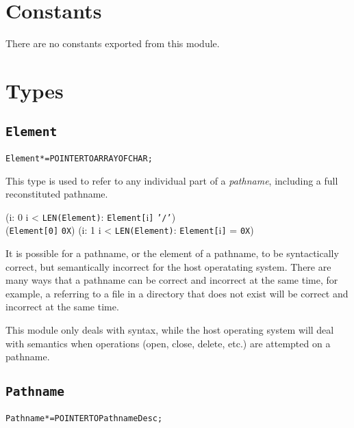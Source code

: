 \section{Constants}

There are no constants exported from this module.


\section{Types}

\subsection{\texttt{Element}}\label{pathnames:element}
\begin{alltt}
  Element* = POINTER TO ARRAY OF CHAR;
\end{alltt}

This type is used to refer to any individual part of a
\emph{pathname}, including a full reconstituted pathname.

\begin{invariant}
  (\forall i: 0 \leq i < \texttt{LEN(Element\deref)}:
  \texttt{Element[}i\texttt{]} \neq \texttt{'/'}) \logicaland
  \\
  (\texttt{Element[0]} \neq \texttt{0X}) \logicaland
  (\exists i: 1 \leq i < \texttt{LEN(Element\deref)}:
  \texttt{Element[}i\texttt{]} = \texttt{0X})
\end{invariant}

\begin{xnote}
It is possible for a pathname, or the element of a pathname, to be
syntactically correct, but semantically incorrect for the host
operatating system. There are many ways that a pathname can be correct
and incorrect at the same time, for example, a referring to a file in
a directory that does not exist will be correct and incorrect at the
same time.

This module only deals with syntax, while the host operating system
will deal with semantics when operations (open, close, delete, etc.)
are attempted on a pathname.
\end{xnote}


\subsection{\texttt{Pathname}}\label{pathnames:pathname}
\begin{alltt}
  Pathname* = POINTER TO PathnameDesc;
\end{alltt}

